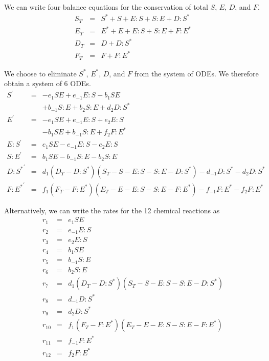 We can write four balance equations for the conservation of total $S$, $E$, $D$, and $F$.
\begin{equation}
    \begin{array}{rcl}
        S_T & = & S^{*} + S + E:S + S:E + D:S^{*} \\
        E_T & = & E^{*} + E + E:S + S:E + F:E^{*} \\
        D_T & = & D + D:S^{*} \\
        F_T & = & F + F:E^{*}
    \end{array}
\end{equation}

We choose to eliminate $S^{*}$, $E^{*}$, $D$, and $F$ from the system of ODEs.
%
We therefore obtain a system of 6 ODEs.
\begin{equation}
    \begin{array}{rcl}
        S^\prime & = & -e_1 S E + e_{-1} E:S -b_1 S E \\
                        &   & + b_{-1} S:E + b_2 S:E + d_2 D:S^{*} \\
        E^\prime & = & -e_1 S E + e_{-1} E:S + e_2 E:S \\
                        &   & - b_1 S E +b_{-1} S:E + f_2 F:E^{*} \\
        E:S^\prime  & = & e_1 S E -e_{-1} E:S -e_2 E:S \\
        S:E^\prime & = & b_1 S E -b_{-1} S:E -b_2 S:E \\
        {D:S^{*}}^\prime & = & d_1 (D_T - D:S^{*}) (S_T - S - E:S - S:E - D:S^{*}) - d_{-1} D:S^{*} -d_2 D:S^{*} \\
        {F:E^{*}}^\prime & = & f_1 (F_T - F:E^{*}) (E_T - E - E:S - S:E - F:E^{*}) - f_{-1} F:E^{*} -f_2 F:E^{*}
    \end{array}
\end{equation}

Alternatively, we can write the rates for the 12 chemical reactions as
\begin{equation}
    \begin{array}{rcl}
        r_1 & = & e_1 S E \\
        r_2 & = & e_{-1} E:S \\
        r_3 & = & e_2 E:S \\
        r_4 & = & b_1 S E \\
        r_5 & = & b_{-1} S:E \\
        r_6 & = & b_2 S:E \\
        r_7 & = & d_1 (D_T - D:S^{*}) (S_T - S - E:S - S:E - D:S^{*}) \\
        r_8 & = & d_{-1} D:S^{*} \\
        r_9 & = & d_2 D:S^{*} \\
        r_{10} & = & f_1 (F_T - F:E^{*}) (E_T - E - E:S - S:E - F:E^{*}) \\
        r_{11} & = & f_{-1} F:E^{*} \\
        r_{12} & = & f_2 F:E^{*}
    \end{array}
\end{equation}

